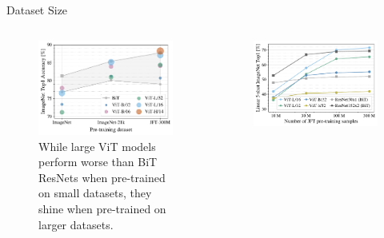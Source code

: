 \begin{frame}{Dataset Size}
    \begin{columns}
        \begin{column}{0.5\textwidth}
            \begin{figure}
                \centering
                \includegraphics[width=\textwidth]{pic/transvolution-i1k-scaling}
                \caption{
                While large ViT models perform worse than BiT ResNets when pre-trained on small datasets, they shine when pre-trained on larger datasets. 
                }
                \label{fig:transvolution}
            \end{figure}
        \end{column}
        \begin{column}{0.5\textwidth}
            \begin{figure}
                \centering
                \includegraphics[width=\textwidth]{pic/imagenet_5shot}

\end{figure}
\end{column}
\end{columns}
\end{frame}
